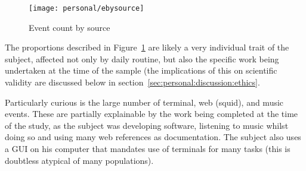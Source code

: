 

\begin{figure}[hp]
    \centering
    \texttt{[image: personal/ebysource]}
    \caption{Event count by source}
    \label{fig:personal:eventsbysource}
\end{figure}

The proportions described in Figure~\ref{fig:personal:eventsbysource} are likely a very individual trait of the subject, affected not only by daily routine, but also the specific work being undertaken at the time of the sample (the implications of this on scientific validity are discussed below in section~\ref{sec:personal:discussion:ethics}.

Particularly curious is the large number of terminal, web (squid), and music events.  These are partially explainable by the work being completed at the time of the study, as the subject was developing software, listening to music whilst doing so and using many web references as documentation.  The subject also uses a GUI on his computer that mandates use of terminals for many tasks (this is doubtless atypical of many populations).



